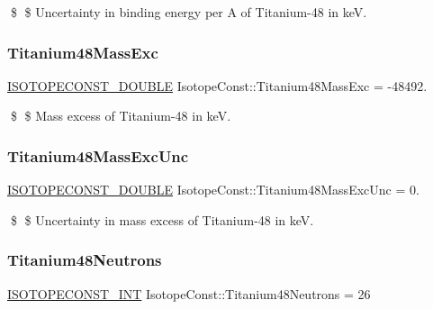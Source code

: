 \$ \$ Uncertainty in binding energy per A of Titanium-\/48 in keV. \mbox{\label{group___isotope_const-_titanium-_ti48_ga4dc22e01e40025cb0d3d3782bf2d4fa2}} 
\subsubsection{\texorpdfstring{Titanium48\+Mass\+Exc}{Titanium48MassExc}}
{\footnotesize\ttfamily \mbox{\hyperlink{group___isotope_const-_macros_ga8f45a7272ce02c0b4c65c44636ed719a}{I\+S\+O\+T\+O\+P\+E\+C\+O\+N\+S\+T\+\_\+\+D\+O\+U\+B\+LE}} Isotope\+Const\+::\+Titanium48\+Mass\+Exc = -\/48492.}

\$ \$ Mass excess of Titanium-\/48 in keV. \mbox{\label{group___isotope_const-_titanium-_ti48_gacf502826ddc13143fb4c6963ab4dc530}} 
\subsubsection{\texorpdfstring{Titanium48\+Mass\+Exc\+Unc}{Titanium48MassExcUnc}}
{\footnotesize\ttfamily \mbox{\hyperlink{group___isotope_const-_macros_ga8f45a7272ce02c0b4c65c44636ed719a}{I\+S\+O\+T\+O\+P\+E\+C\+O\+N\+S\+T\+\_\+\+D\+O\+U\+B\+LE}} Isotope\+Const\+::\+Titanium48\+Mass\+Exc\+Unc = 0.}

\$ \$ Uncertainty in mass excess of Titanium-\/48 in keV. \mbox{\label{group___isotope_const-_titanium-_ti48_ga5b50f5de32bbe9b5ad7145a945014bdd}} 
\subsubsection{\texorpdfstring{Titanium48\+Neutrons}{Titanium48Neutrons}}
{\footnotesize\ttfamily \mbox{\hyperlink{group___isotope_const-_macros_ga5f18360b3e99483a35c32d789e62621c}{I\+S\+O\+T\+O\+P\+E\+C\+O\+N\+S\+T\+\_\+\+I\+NT}} Isotope\+Const\+::\+Titanium48\+Neutrons = 26}


